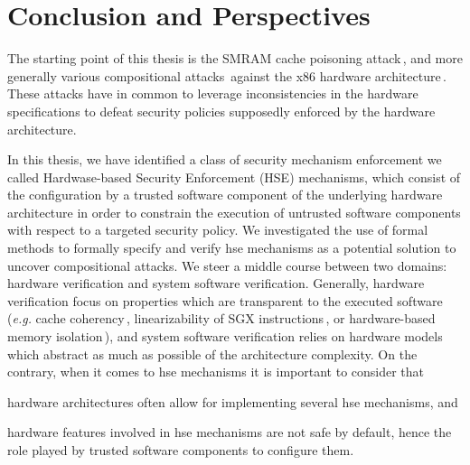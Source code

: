 \chapter{Conclusion and Perspectives}
\label{chapter:conclusion}


\vspace{1cm}%
\noindent
%
The starting point of this thesis is the SMRAM cache poisoning
attack\,\cite{duflot2009smram,wojtczuk2009smram}, and more generally various
compositional attacks\,\cite{wing2003compositionalattack} against the x86
hardware
architecture\,\cite{kovah2015senter,domas2015sinkhole,kallenberg2015racecondition}.
%
These attacks have in common to leverage inconsistencies in the hardware
specifications to defeat security policies supposedly enforced by the hardware
architecture.

In this thesis, we have identified a class of security mechanism enforcement we
called Hardwase-based Security Enforcement (HSE) mechanisms, which consist of
the configuration by a trusted software component of the underlying hardware
architecture in order to constrain the execution of untrusted software
components with respect to a targeted security policy.
%
We investigated the use of formal methods to formally specify and verify
\ac{hse} mechanisms as a potential solution to uncover compositional attacks.
%
We steer a middle course between two domains: hardware verification and system
software verification.
%
Generally, hardware verification focus on properties which are transparent to
the executed software (\emph{e.g.} cache
coherency\,\cite{stern1995cachecoherence}, linearizability of SGX
instructions\,\cite{leslie2015linsgx}, or hardware-based memory
isolation\,\cite{lie2003xom}), and system software verification relies on
hardware models which abstract as much as possible of the architecture
complexity.
%
On the contrary, when it comes to \ac{hse} mechanisms it is important to
consider that
%
\begin{inparaenum}[(1)]
\item \label{needreuse}%
  hardware architectures often allow for implementing several \ac{hse}
  mechanisms, and
\item \label{needreduce}%
  hardware features involved in \ac{hse} mechanisms are not safe by default,
  hence the role played by trusted software components to configure them.
\end{inparaenum}


